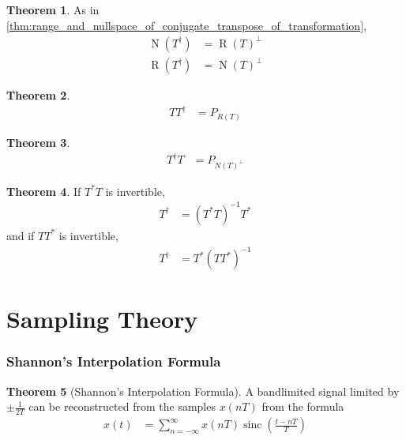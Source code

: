 \documentclass[titlepage, fleqn, a4paper, 12pt, twoside]{article}
\theoremstyle{definition}
\theoremstyle{theorem}
\newtheorem{theorem}{Theorem}
\DeclareMathOperator{\sinc}{\mathrm{sinc}}
\DeclareMathOperator{\nullspace}{\mathrm{N}}
\DeclareMathOperator{\range}{\mathrm{R}}
\begin{document}
\begin{theorem}
	As in \cref{thm:range_and_nullspace_of_conjugate_transpose_of_transformation},
	\begin{align*}
		\nullspace\left( T^{\dagger} \right) &= \range(T)^{\perp}\\
		\range\left( T^{\dagger} \right) &= \nullspace(T)^{\perp}
	\end{align*}
	\label{thm:range_and_nullspace_of_pseudoinverse_of_transformation}
\end{theorem}

\begin{theorem}
	\begin{align*}
		T T^{\dagger} &= P_{R(T)}
	\end{align*}
\end{theorem}

\begin{theorem}
	\begin{align*}
		T^{\dagger} T &= P_{{N(T)}^{\perp}}
	\end{align*}
\end{theorem}

\begin{theorem}
	If $T^* T$ is invertible,
	\begin{align*}
		T^{\dagger} &= \left( T^* T \right)^{-1} T^*
	\end{align*}
	and if $T T^*$ is invertible,
	\begin{align*}
		T^{\dagger} &= T^* \left( T T^* \right)^{-1}
	\end{align*}
\end{theorem}

\clearpage
\part{Sampling Theory}

\section{Shannon's Interpolation Formula}

\begin{theorem}[Shannon's Interpolation Formula]
	A bandlimited signal limited by $\pm\frac{1}{2 T}$ can be reconstructed from the samples $x(n T)$ from the formula
	\begin{align*}
		x(t) &= \sum\limits_{n = -\infty}^{\infty} x(n T) \sinc\left( \frac{t - n T}{T} \right)
	\end{align*}
	\label{thm:Shannons_Interpolation_Formula}
\end{theorem}

\clearpage
\printindex
\end{document}
